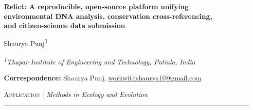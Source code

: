 \documentclass[11pt, a4paper]{article}
\begin{document}
\begin{center}
    {\LARGE\bfseries Relict: A reproducible, open-source platform unifying\\[4pt]
    environmental DNA analysis, conservation cross-referencing,\\[4pt]
    and citizen-science data submission}

    \vspace{1.2em}

    {\large Shaurya Punj\textsuperscript{1}%
    \,}

    \vspace{0.6em}

    {\small\itshape
    \textsuperscript{1}Thapar Institute of Engineering and Technology, Patiala, India}

    \vspace{0.4em}

    {\small\textbf{Correspondence:} Shaurya Punj,
    \href{mailto:workwithshaurya10@gmail.com}{workwithshaurya10@gmail.com}}

    \vspace{0.8em}

    {\footnotesize\textsc{Application} \quad|\quad
    \textit{Methods in Ecology and Evolution}}
\end{center}

\newcommand{\orcidlink}[1]{%
    \href{https://orcid.org/#1}{\textsuperscript{\textcolor{green!60!black}{iD}}}%
}

\vspace{1em}
\hrule
\vspace{1.5em}

\end{document}
